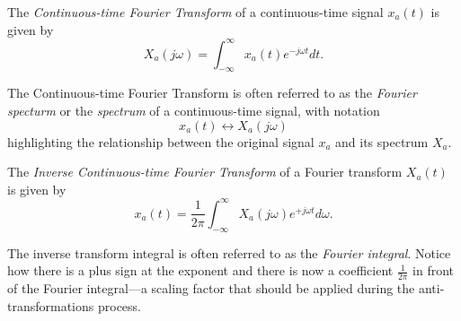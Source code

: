 \documentclass[\documentfontsize, twocolumn]{\classname}
\begin{document}
\begin{defin}
    The \emph{Continuous-time Fourier Transform} of a continuous-time signal $x_a(t)$ is given by
    \begin{equation}\label{eqn:continuousTimeFourierTransform}
        X_a(j\omega) = \int_{-\infty}^\infty x_a(t) e^{-j\omega t} dt.
    \end{equation}
\end{defin}

The Continuous-time Fourier Transform is often referred to as the \emph{Fourier
specturm} or the \emph{spectrum} of a continuous-time signal, with notation 
\[
	x_a(t) \longleftrightarrow X_a(j\omega)
\]
highlighting the relationship between the original signal $x_a$ and its
spectrum $X_a$.

\begin{defin}
    The \emph{Inverse Continuous-time Fourier Transform} of a Fourier transform $X_a(t)$ is given by
    \begin{equation}\label{eqn:inverseContinuousTimeFourierTransform}
        x_a(t) = \frac 1 {2\pi} \int_{-\infty}^\infty X_a(j\omega) e^{+j\omega t} d\omega.
    \end{equation}
\end{defin}

The inverse transform integral is often referred to as the \emph{Fourier
integral}. Notice how there is a plus sign at the exponent and there is now a
coefficient $\frac 1 {2\pi}$ in front of the Fourier integral---a scaling
factor that should be applied during the anti-transformations process.
\end{document}
